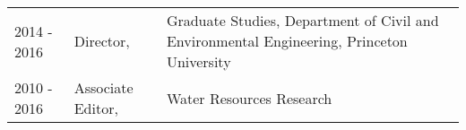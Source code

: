 \documentclass[10pt]{report}
\begin{document}
\begin{longtable}{p{.75in} p{1.1in} p{4.2in}}
2014 - 2016 & Director, & Graduate Studies, Department of Civil and Environmental Engineering, Princeton University \\
2010 - 2016 & Associate Editor, & Water Resources Research \\ 

\end{longtable}
\end{document}
